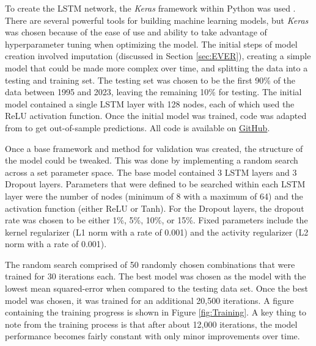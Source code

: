 To create the LSTM network, the \textit{Keras} framework within Python was used \citep{chollet2015keras}. There are several powerful tools for building machine learning models, but \textit{Keras} was chosen because of the ease of use and ability to take advantage of hyperparameter tuning when optimizing the model. The initial steps of model creation involved imputation (discussed in Section \ref{sec:EVER}), creating a simple model that could be made more complex over time, and splitting the data into a testing and training set. The testing set was chosen to be the first 90\% of the data between 1995 and 2023, leaving the remaining 10\% for testing. The initial model contained a single LSTM layer with 128 nodes, each of which used the ReLU activation function. Once the initial model was trained, code was adapted from \cite{lstmkeras} to get out-of-sample predictions. All code is available on \href{https://github.com/lliucci/Writing-Project}{GitHub}.

Once a base framework and method for validation was created, the structure of the model could be tweaked. This was done by implementing a random search across a set parameter space. The base model contained 3 LSTM layers and 3 Dropout layers. Parameters that were defined to be searched within each LSTM layer were the number of nodes (minimum of 8 with a maximum of 64) and the activation function (either ReLU or Tanh). For the Dropout layers, the dropout rate was chosen to be either 1\%, 5\%, 10\%, or 15\%. Fixed parameters include the kernel regularizer (L1 norm with a rate of 0.001) and the activity regularizer (L2 norm with a rate of 0.001).

The random search comprised of 50 randomly chosen combinations that were trained for 30 iterations each. The best model was chosen as the model with the lowest mean squared-error when compared to the testing data set. Once the best model was chosen, it was trained for an additional 20,500 iterations. A figure containing the training progress is shown in Figure \ref{fig:Training}. A key thing to note from the training process is that after about 12,000 iterations, the model performance becomes fairly constant with only minor improvements over time.


